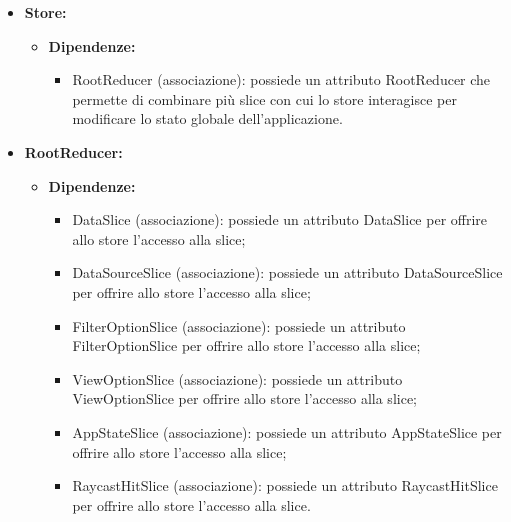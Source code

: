 \begin{itemize}
    \item \textbf{Store:}
    \begin{itemize}
        \item \textbf{Dipendenze:}
        \begin{itemize}
            \item RootReducer (associazione): possiede un attributo RootReducer che permette di combinare più slice
            con cui lo store interagisce per modificare lo stato globale dell’applicazione.
        \end{itemize}  
    \end{itemize}

    \item \textbf{RootReducer:}
    \begin{itemize}
        \item \textbf{Dipendenze:}
        \begin{itemize}
            \item DataSlice (associazione): possiede un attributo DataSlice per offrire allo store l’accesso alla slice;
            \item DataSourceSlice (associazione): possiede un attributo DataSourceSlice per offrire allo store l’accesso alla slice;
            \item FilterOptionSlice (associazione): possiede un attributo FilterOptionSlice per offrire allo store l’accesso alla slice;
            \item ViewOptionSlice (associazione): possiede un attributo ViewOptionSlice per offrire allo store l’accesso alla slice;
            \item AppStateSlice (associazione): possiede un attributo AppStateSlice per offrire allo store l’accesso alla slice;
            \item RaycastHitSlice (associazione): possiede un attributo RaycastHitSlice per offrire allo store l’accesso alla slice.
        \end{itemize}  
    \end{itemize}
\end{itemize}

